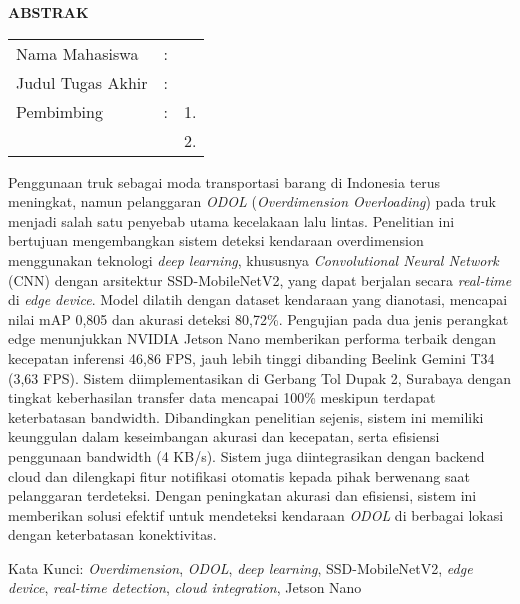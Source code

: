 \begin{center}
  \large\textbf{ABSTRAK}
\end{center}


\vspace{2ex}

\begingroup
\setlength{\tabcolsep}{0pt}

\noindent
\begin{tabularx}{\textwidth}{l >{\centering}m{2em} X}
  Nama Mahasiswa    & : & \name{}         \\

  Judul Tugas Akhir & : & \tatitle{}      \\

  Pembimbing        & : & 1. \advisor{}   \\
                    &   & 2. \coadvisor{} \\
\end{tabularx} 
\endgroup

Penggunaan truk sebagai moda transportasi barang di Indonesia terus meningkat, namun pelanggaran \emph{ODOL} (\emph{Overdimension Overloading}) pada truk menjadi salah satu penyebab utama kecelakaan lalu lintas. Penelitian ini bertujuan mengembangkan sistem deteksi kendaraan over\-dimension menggunakan teknologi \emph{deep learning}, khususnya \emph{Convolutional Neural Network} (CNN) dengan arsitektur SSD-MobileNetV2, yang dapat berjalan secara \emph{real-time} di \emph{edge device}. Model dilatih dengan dataset kendaraan yang dianotasi, mencapai nilai mAP 0,805 dan akurasi deteksi 80,72\%. Pengujian pada dua jenis perangkat edge menunjukkan NVIDIA Jetson Nano memberikan performa terbaik dengan kecepatan inferensi 46,86 FPS, jauh lebih tinggi dibanding Beelink Gemini T34 (3,63 FPS). Sistem diimplementasikan di Gerbang Tol Dupak 2, Surabaya dengan tingkat keberhasilan transfer data mencapai 100\% meskipun terdapat keterbatasan bandwidth. Dibandingkan penelitian sejenis, sistem ini memiliki keunggulan dalam keseimbangan akurasi dan kecepatan, serta efisiensi penggunaan bandwidth (4 KB/s). Sistem juga diintegrasikan dengan backend cloud dan dilengkapi fitur notifikasi otomatis kepada pihak berwenang saat pelanggaran terdeteksi. Dengan peningkatan akurasi dan efisiensi, sistem ini memberikan solusi efektif untuk mendeteksi kendaraan \emph{ODOL} di berbagai lokasi dengan keterbatasan konektivitas.

Kata Kunci: \emph{Overdimension}, \emph{ODOL}, \emph{deep learning}, SSD-MobileNetV2, \emph{edge device}, \emph{real-time detection}, \emph{cloud integration}, Jetson Nano